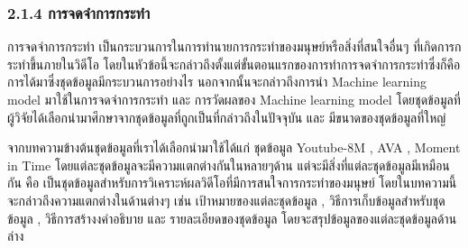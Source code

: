 \subsubsection*{2.1.4 การจดจำการกระทำ}
การจดจำการกระทำ เป็นกระบวนการในการทำนายการกระทำของมนุษย์หรือสิ่งที่สนใจอื่นๆ ที่เกิดการกระทำขึ้นภายในวิดีโอ โดยในหัวข้อนี้จะกล่าวถึงตั้งแต่ขั้นตอนแรกของการทำการจดจำการกระทำซึ่งก็คือ การได้มาซึ่งชุดข้อมูลมีกระบวนการอย่างไร นอกจากนั้นจะกล่าวถึงการนำ Machine learning model มาใช้ในการจดจำการกระทำ และ การวัดผลของ Machine learning model โดยชุดข้อมูลที่ผู้วิจัยได้เลือกนำมาศึกษาจากชุดข้อมูลที่ถูกเป็นที่กล่าวถึงในปัจจุบัน และ มีขนาดของชุดข้อมูลที่ใหญ่ 
\par
จากบทความข้างต้นชุดข้อมูลที่เราได้เลือกนำมาใช้ได้แก่ ชุดข้อมูล Youtube-8M , AVA , Moment in Time โดยแต่ละชุดข้อมูลจะมีความแตกต่างกันในหลายๆด้าน แต่จะมีสิ่งที่แต่ละชุดข้อมูลมีเหมือนกัน คือ เป็นชุดข้อมูลสำหรับการวิเคราะห์ผลวิดีโอที่มีการสนใจการกระทำของมนุษย์ โดยในบทความนี้จะกล่าวถึงความแตกต่างในด้านต่างๆ เช่น เป้าหมายของแต่ละชุดข้อมูล , วิธีการเก็บข้อมูลสำหรับชุดข้อมูล , วิธีการสร้างงคำอธิบาย และ รายละเอียดของชุดข้อมูล โดยจะสรุปข้อมูลของแต่ละชุดข้อมูลด้านล่าง

